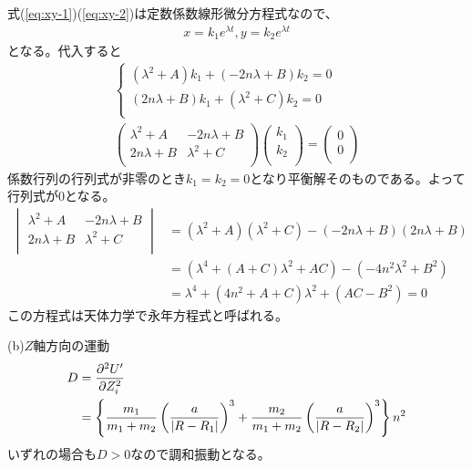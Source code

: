         式(\ref{eq:xy-1})(\ref{eq:xy-2})は定数係数線形微分方程式なので、
			\begin{align*}
				x = k_1e^{\lambda t}, y = k_2e^{\lambda t}
			\end{align*}
			となる。代入すると
			\begin{align*}
                \begin{cases}
				(\lambda^2 + A)k_1 + (-2n\lambda + B)k_2 = 0\\
				(2n\lambda + B)k_1 + (\lambda^2 + C)k_2 = 0\\
                \end{cases}\\
				\begin{pmatrix}
					\lambda^2 + A & -2n\lambda + B\\
					2n\lambda + B & \lambda^2 + C\\
				\end{pmatrix}
				\begin{pmatrix}
					k_1\\
					k_2\\
				\end{pmatrix}
				=
				\begin{pmatrix}
					0\\
					0\\
				\end{pmatrix}
			\end{align*}
			係数行列の行列式が非零のとき$k_1 = k_2 = 0$となり平衡解そのものである。よって行列式が0となる。
			\begin{align*}
				\begin{vmatrix}
					\lambda^2 + A & -2n\lambda + B\\
					2n\lambda + B & \lambda^2 + C\\
				\end{vmatrix}
				&= 
				(\lambda^2 + A)(\lambda^2 + C) - (-2n\lambda + B)(2n\lambda + B)\\
				&= (\lambda^4 + (A + C)\lambda^2 + AC) - (- 4n^2\lambda^2 + B^2)\\
				&= \lambda^4 + (4n^2 + A + C)\lambda^2 + (AC - B^2) = 0
			\end{align*}
			この方程式は天体力学で永年方程式と呼ばれる。

		(b)$Z$軸方向の運動
			\begin{align*}
				D &= \pd[^2U']{Z_i^2}\\
                &= \mlr{ \frac{m_1}{m_1 + m_2}\lr{\frac{a}{|R - R_1|}}^3 + \frac{m_2}{m_1 + m_2}\lr{\frac{a}{|R - R_2|}}^3 }n^2
			\end{align*}
            いずれの場合も$D > 0$なので調和振動となる。

